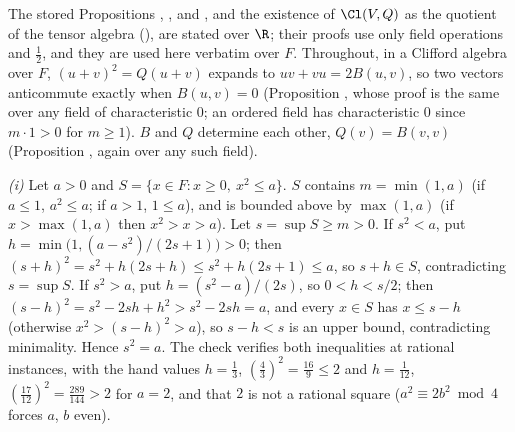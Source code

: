 The stored Propositions , ,  and , and the existence of $\Cl(V, Q)$ as the quotient of the tensor algebra (), are stated over $\R$; their proofs use only field operations and $\tfrac12$, and they are used here verbatim over $F$. Throughout, in a Clifford algebra over $F$, $(u + v)^{2} = Q(u + v)$ expands to $uv + vu = 2B(u, v)$, so two vectors anticommute exactly when $B(u, v) = 0$ (Proposition , whose proof is the same over any field of characteristic $0$; an ordered field has characteristic $0$ since $m \cdot 1 > 0$ for $m \ge 1$). $B$ and $Q$ determine each other, $Q(v) = B(v, v)$ (Proposition , again over any such field).

\emph{(i)} Let $a > 0$ and $S = \{x \in F : x \ge 0,\ x^{2} \le a\}$. $S$ contains $m = \min(1, a)$ (if $a \le 1$, $a^{2} \le a$; if $a > 1$, $1 \le a$), and is bounded above by $\max(1, a)$ (if $x > \max(1, a)$ then $x^{2} > x > a$). Let $s = \sup S \ge m > 0$. If $s^{2} < a$, put $h = \min\bigl(1, (a - s^{2})/(2s + 1)\bigr) > 0$; then $(s + h)^{2} = s^{2} + h(2s + h) \le s^{2} + h(2s + 1) \le a$, so $s + h \in S$, contradicting $s = \sup S$. If $s^{2} > a$, put $h = (s^{2} - a)/(2s)$, so $0 < h < s/2$; then $(s - h)^{2} = s^{2} - 2sh + h^{2} > s^{2} - 2sh = a$, and every $x \in S$ has $x \le s - h$ (otherwise $x^{2} > (s - h)^{2} > a$), so $s - h < s$ is an upper bound, contradicting minimality. Hence $s^{2} = a$. The check verifies both inequalities at rational instances, with the hand values $h = \tfrac13$, $(\tfrac43)^{2} = \tfrac{16}{9} \le 2$ and $h = \tfrac1{12}$, $(\tfrac{17}{12})^{2} = \tfrac{289}{144} > 2$ for $a = 2$, and that $2$ is not a rational square ($a^{2} \equiv 2b^{2} \bmod 4$ forces $a$, $b$ even).

